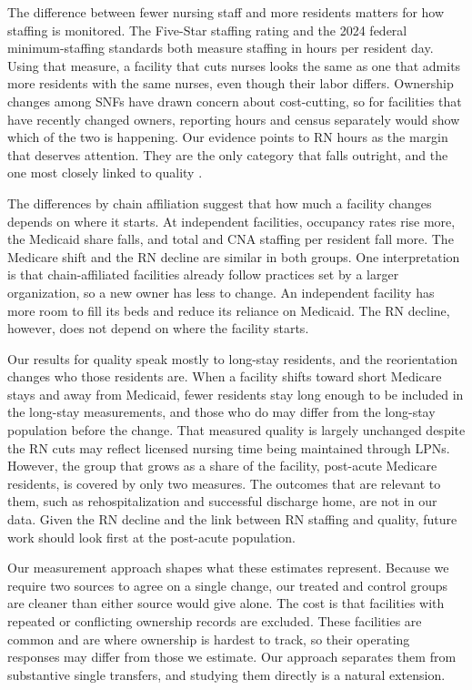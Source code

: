 \documentclass[12pt]{article}
\begin{document}
The difference between fewer nursing staff and more residents matters for how staffing is monitored. The Five-Star staffing rating and the 2024 federal minimum-staffing standards \citep{cms_2024_min_staffing} both measure staffing in hours per resident day. Using that measure, a facility that cuts nurses looks the same as one that admits more residents with the same nurses, even though their labor differs. Ownership changes among SNFs have drawn concern about cost-cutting, so for facilities that have recently changed owners, reporting hours and census separately would show which of the two is happening. Our evidence points to RN hours as the margin that deserves attention. They are the only category that falls outright, and the one most closely linked to quality \citep{lin_2014}.

The differences by chain affiliation suggest that how much a facility changes depends on where it starts. At independent facilities, occupancy rates rise more, the Medicaid share falls, and total and CNA staffing per resident fall more. The Medicare shift and the RN decline are similar in both groups. One interpretation is that chain-affiliated facilities already follow practices set by a larger organization, so a new owner has less to change. An independent facility has more room to fill its beds and reduce its reliance on Medicaid. The RN decline, however, does not depend on where the facility starts.

Our results for quality speak mostly to long-stay residents, and the reorientation changes who those residents are. When a facility shifts toward short Medicare stays and away from Medicaid, fewer residents stay long enough to be included in the long-stay measurements, and those who do may differ from the long-stay population before the change. That measured quality is largely unchanged despite the RN cuts may reflect licensed nursing time being maintained through LPNs. However, the group that grows as a share of the facility, post-acute Medicare residents, is covered by only two measures. The outcomes that are relevant to them, such as rehospitalization and successful discharge home, are not in our data. Given the RN decline and the link between RN staffing and quality, future work should look first at the post-acute population.

Our measurement approach shapes what these estimates represent. Because we require two sources to agree on a single change, our treated and control groups are cleaner than either source would give alone. The cost is that facilities with repeated or conflicting ownership records are excluded. These facilities are common and are where ownership is hardest to track, so their operating responses may differ from those we estimate. Our approach separates them from substantive single transfers, and studying them directly is a natural extension.
\end{document}
